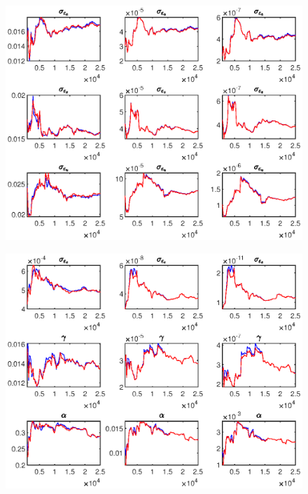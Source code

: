 \documentclass[11pt,preprint, authoryear]{elsarticle}
\let\origfigure\figure
\let\endorigfigure\endfigure
\renewenvironment{figure}[1][2] {
    \expandafter\origfigure\expandafter[H]
} {
    \endorigfigure
}
\numberwithin{equation}{section}
\numberwithin{figure}{section}
\numberwithin{table}{section}
\begin{document}
\begin{figure}
     \centering
     \begin{subfigure}[H]{0.49\textwidth}
         \centering
         \includegraphics[width=\textwidth]{code/MCMC_1_money}
     \end{subfigure}
     \begin{subfigure}[H]{0.49\textwidth}
         \centering
         \includegraphics[width=\textwidth]{code/MCMC_2_money}
     \end{subfigure}
    \begin{subfigure}[H]{0.49\textwidth}
         \centering

\end{subfigure}
\end{figure}
\end{document}
